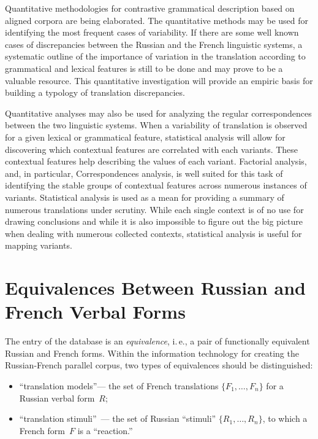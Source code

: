 \begin{multicols}{2}
   Quantitative methodologies for contrastive grammatical description based on aligned corpora 
are being elaborated. The quantitative methods may be used for identifying the most frequent cases 
of variability. If there are some well known cases of discrepancies between the Russian and the 
French linguistic systems, a systematic outline of the importance of variation in the translation 
according to grammatical and lexical features is still to be done and may prove to be a valuable 
resource. This quantitative investigation will provide an empiric basis for building a typology of 
translation discrepancies.
   
   Quantitative analyses may also be used for analyzing the regular correspondences between the 
two linguistic systems. When a variability of translation is observed for a given lexical or 
grammatical feature, statistical analysis will allow for discovering which contextual features are 
correlated with each variants. These contextual features help describing the values of each variant. 
Factorial analysis, and, in particular, Correspondences analysis, is well suited for this task of 
identifying the stable groups of contextual features across numerous instances of variants. Statistical 
analysis is used as a mean for providing a summary of numerous translations under scrutiny. While 
each single context is of no use for drawing conclusions and while it is also impossible to figure 
out the big picture when dealing with numerous collected contexts, statistical analysis is useful for 
mapping variants.



\section{Equivalences Between Russian and French Verbal Forms}

 \noindent
   The entry of the database is an \textit{equivalence}, i.\,e., a pair of functionally equivalent 
Russian and French forms. Within the information technology for creating the Russian-French 
parallel corpus, two types of equivalences should be distinguished:
   \begin{itemize}
\item  ``translation models''--- the set of French translations $\{F_1, \ldots , F_n\}$ for a Russian 
verbal form~$R$;
\item ``translation stimuli''~--- the set of Russian ``stimuli'' $\{R_1, \ldots , R_n\}$, to which a 
French form~$F$ is a ``reaction.''
\end{itemize}
   

\end{multicols}
